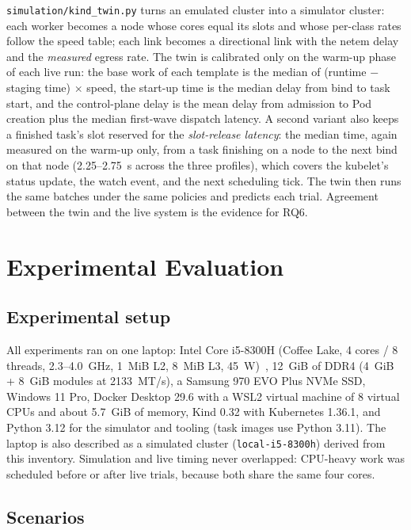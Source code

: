 \documentclass[12pt,a4paper]{report}
\begin{document}
\texttt{simulation/kind\_twin.py} turns an emulated cluster into a
simulator cluster: each worker becomes a node whose cores equal its
slots and whose per-class rates follow the speed table; each link becomes
a directional link with the netem delay and the \emph{measured} egress
rate. The twin is calibrated only on the warm-up phase of each live run:
the base work of each template is the median of (runtime $-$ staging time)
$\times$ speed, the start-up time is the median delay from bind to task
start, and the control-plane delay is the mean delay from admission to
Pod creation plus the median first-wave dispatch latency. A second
variant also keeps a finished task's slot reserved for the
\emph{slot-release latency}: the median time, again measured on the
warm-up only, from a task finishing on a node to the next bind on that
node (2.25--2.75~s across the three profiles), which covers the kubelet's
status update, the watch event, and the next scheduling tick. The twin then runs
the same batches under the same policies and predicts each trial.
Agreement between the twin and the live system is the evidence for RQ6.

\chapter{Experimental Evaluation}
\label{ch:eval}

\section{Experimental setup}

All experiments ran on one laptop: Intel Core i5-8300H (Coffee Lake, 4
cores / 8 threads, 2.3--4.0~GHz, 1~MiB L2, 8~MiB L3, 45~W)~\cite{intel-i5-8300h},
12~GiB of DDR4 (4~GiB + 8~GiB modules at 2133~MT/s), a Samsung 970 EVO Plus
NVMe SSD, Windows 11 Pro, Docker Desktop 29.6 with a WSL2 virtual machine of
8 virtual CPUs and about 5.7~GiB of memory, Kind 0.32 with Kubernetes
1.36.1, and Python 3.12 for the simulator and tooling (task images use
Python 3.11). The laptop is also described as a simulated cluster
(\texttt{local-i5-8300h}) derived from this inventory.
Simulation and live timing never overlapped: CPU-heavy work was scheduled
before or after live trials, because both share the same four cores.

\section{Scenarios}
\end{document}
